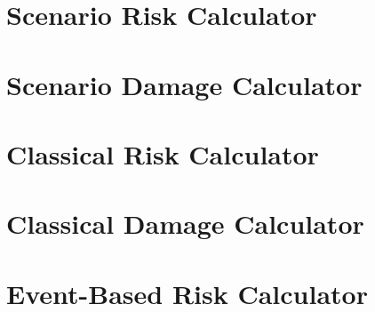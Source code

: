 \section{Scenario Risk Calculator}
   \label{sec:acc-scenario-risk}
   
\section{Scenario Damage Calculator}
   \label{sec:acc-scenario-damage}
   
\section{Classical Risk Calculator}
   \label{sec:acc-classical-risk}
   
\section{Classical Damage Calculator}
   \label{sec:acc-classical-damage}
   
\section{Event-Based Risk Calculator}
   \label{sec:acc-eventbased}
   
   \cleardoublepage